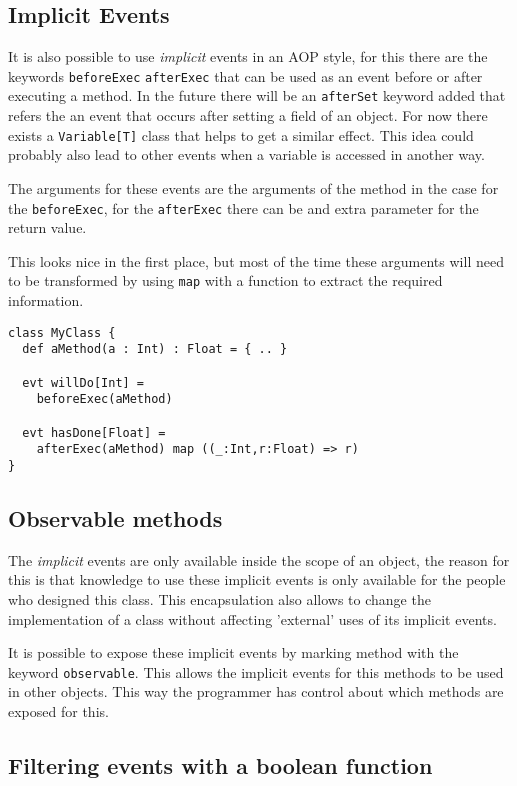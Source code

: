 \documentclass{article}
\begin{document}
\subsection{Implicit Events}
It is also possible to use \emph{implicit} events in an AOP style, for this
there are the keywords {\tt beforeExec} {\tt afterExec} that can be used 
as an event before or after executing a method. In the future there will
be an {\tt afterSet} keyword added that refers the an event that occurs
after setting a field of an object. For now there exists a {\tt Variable[T]}
class that helps to get a similar effect. This idea could probably also lead 
to other events when a variable is accessed in another way.

The arguments for these events are the arguments of the method in the 
case for the {\tt beforeExec}, for the {\tt afterExec} there can be and extra 
parameter for the return value. 

This looks nice in the first place, but most of the time these arguments
will need to be transformed by using {\tt map} with a function to extract
the required information. 

\begin{lstlisting}
class MyClass {
  def aMethod(a : Int) : Float = { .. }

  evt willDo[Int] = 
    beforeExec(aMethod)

  evt hasDone[Float] = 
    afterExec(aMethod) map ((_:Int,r:Float) => r)
}
\end{lstlisting}

\subsection{Observable methods}
The \emph{implicit} events are only available inside the scope of an object,
the reason for this is that knowledge to use these implicit events
is only available for the people who designed this class. This
encapsulation also allows to change the implementation of a class
without affecting 'external' uses of its implicit events.

It is possible to expose these implicit events by marking method with 
the keyword {\tt observable}.  This allows the implicit events for this
methods to be used in other objects. This way the programmer has
control about which methods are exposed for this.


\subsection{Filtering events with a boolean function}
\end{document}
